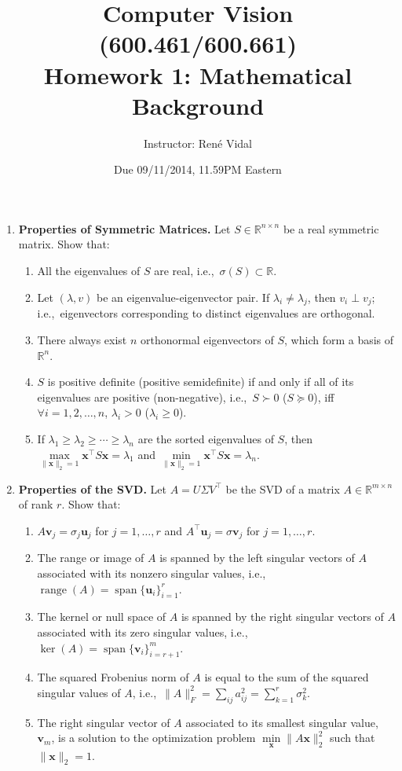 \documentclass[10pt]{article}
\DeclareMathOperator*{\range}{range}
\DeclareMathOperator*{\spn}{span}
\def\u{\boldsymbol{u}}
\def\x{\boldsymbol{x}}
\def\v{\boldsymbol{v}}
\def\transpose{\top}
\newcommand{\ie}{{i.e.,~}}
\renewcommand{\Re}{{\mathbb{R}}}
\begin{document}
\title{
\vspace{-19mm}
Computer Vision (600.461/600.661)\\
Homework 1: Mathematical Background}
\author{Instructor: Ren\'e Vidal}
\date{Due 09/11/2014, 11.59PM Eastern}

\maketitle

\begin{enumerate}

\item \textbf{Properties of Symmetric Matrices.} 
Let $S\in\Re^{n\times n}$ be a real symmetric matrix. Show that: 
%
\begin{enumerate}
\item All the eigenvalues of $S$ are real, \ie $\sigma(S) \subset \Re$.
\item Let $(\lambda,v)$ be an eigenvalue-eigenvector pair. If $\lambda_i \ne \lambda_j$, then $v_i \perp v_j$; \ie  eigenvectors corresponding to distinct eigenvalues are orthogonal.
\item There always exist $n$ orthonormal eigenvectors of $S$, which form a basis of $\Re^n$.
\item $S$ is positive definite (positive semidefinite) if and only if all of its eigenvalues are positive (non-negative), \ie  $S \succ 0$ ($S \succeq 0$), iff $ \forall i =
1,2,\ldots,n$, $\lambda_i > 0$ ($\lambda_i \ge 0$).
\item If $\lambda_1 \ge \lambda_2 \ge \cdots \ge \lambda_n $ are the sorted eigenvalues of $S$, then $\max\limits_{\|\x\|_2 = 1} \x^\transpose S \x = \lambda_1$ and
$\min\limits_{\|\x\|_2 = 1} \x^\transpose S \x  = \lambda_n$.
\end{enumerate}

\item \textbf{Properties of the SVD.}
Let $ A = U \Sigma V^\transpose$ be the SVD of a matrix $A \in \Re^{m\times n}$ of rank $r$. Show that:
%
\begin{enumerate}
\item $A \v_j = \sigma_j \u_j$ for $j=1,\dots,r$ and $A^\transpose \u_j = \sigma \v_j$ for $j=1,\dots,r$.
\item The range or image of $A$ is spanned by the left singular vectors of $A$ associated with its nonzero singular values, \ie $\range(A) = \spn\{\u_i\}_{i=1}^r$.
\item The kernel or null space of $A$ is spanned by the right singular vectors of $A$ associated with its zero singular values, \ie $\ker(A) = \spn\{\v_i\}_{i=r+1}^m$.
\item The squared Frobenius norm of $A$ is equal to the sum of the squared singular values of $A$, \ie $\|A\|_F^2 = \sum_{ij} a_{ij}^2 = \sum_{k=1}^r \sigma_k^2$.
\item The right singular vector of $A$ associated to its smallest singular value, $\v_m$,  is a solution to the optimization problem $\min\limits_{\x} \|A\x\|_2^2$ such that $\|\x\|_2 = 1$.
\end{enumerate}


\end{enumerate}
\end{document}
